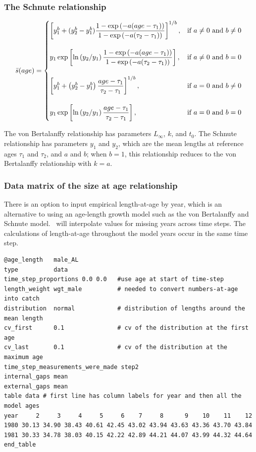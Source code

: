 \subsubsection{The Schnute relationship}\label{sec:AgeLength-Schnute}

\begin{equation}
\bar{s}(age)=\displaystyle\begin{cases}
  \left[ y_1^b + (y_2^b - y_1^b) \dfrac{1-\exp \left(-a(age - \tau_1) \right)}{1-\exp \left(-a(\tau_2 - \tau_1) \right)} \right]^{1/b}, & \text{if $a\ne0$ and $b\ne0$} \\
  \AddVspace
  y_1 \exp \left[ \ln \left( y_2 / y_1 \right) \dfrac{1-\exp \left(-a(age - \tau_1) \right)}{1-\exp \left(-a(\tau_2 - \tau_1) \right)} \right], & \text{if $a\ne0$ and $b=0$} \\
  \AddVspace
  \left[ y_1^b + \left( y_2^b - y_1^b \right) \dfrac{age-\tau_1}{\tau_2 - \tau_1} \right]^{1/b}, & \text{if $a=0$ and $b\ne0$} \\
  \AddVspace
  y_1 \exp \left[ \ln \left( y_2/y_1 \right) \dfrac{age-\tau_1}{\tau_2 - \tau_1} \right] , & \text{if $a=0$ and $b=0$} \\
  \end{cases}
\end{equation}

The von Bertalanffy relationship has parameters $L_\infty$, $k$, and $t_0$. The Schnute relationship \citep{836} has parameters $y_1$ and $y_2$, which are the mean lengths at reference ages $\tau_1$ and $\tau_2$, and $a$ and $b$; when $b=1$, this relationship reduces to the von Bertalanffy relationship with $k=a$.

\subsubsection{Data matrix of the size at age relationship}\label{sec:AgeLength-Data}

There is an option to input empirical length-at-age by year, which is an alternative to using an age-length growth model such as the von Bertalanffy and Schnute model. \CNAME\ will interpolate values for missing years across time steps. The calculations of length-at-age throughout the model years occur in the same time step.

{\small{\begin{verbatim}
@age_length   male_AL
type          data
time_step_proportions 0.0 0.0   #use age at start of time-step
length_weight wgt_male          # needed to convert numbers-at-age into catch
distribution  normal            # distribution of lengths around the mean length
cv_first      0.1               # cv of the distribution at the first age
cv_last       0.1               # cv of the distribution at the maximum age
time_step_measurements_were_made step2
internal_gaps mean
external_gaps mean
table data # first line has column labels for year and then all the model ages
year     2     3     4     5     6    7     8      9    10    11    12
1980 30.13 34.90 38.43 40.61 42.45 43.02 43.94 43.63 43.36 43.70 43.84
1981 30.33 34.78 38.03 40.15 42.22 42.89 44.21 44.07 43.99 44.32 44.64
end_table
\end{verbatim}}}

